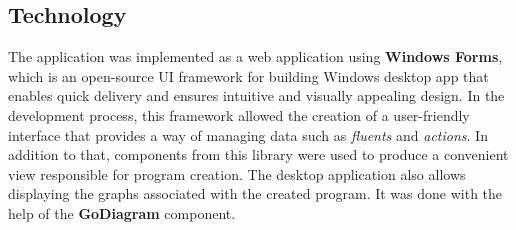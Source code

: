\documentclass[a4paper]{article}
\begin{document}
\subsection{Technology}
%
The application was implemented as a web application using \textbf{Windows Forms}, which is an open-source UI framework for building Windows desktop app that enables quick delivery and ensures intuitive and visually appealing design. In the development process, this framework allowed the creation of a user-friendly interface that provides a way of managing data such as \textit{fluents} and \textit{actions}. In addition to that, components from this library were used to produce a convenient view responsible for program creation. The desktop application also allows displaying the graphs associated with the created program. It was done with the help of the \textbf{GoDiagram} component.
\end{document}
